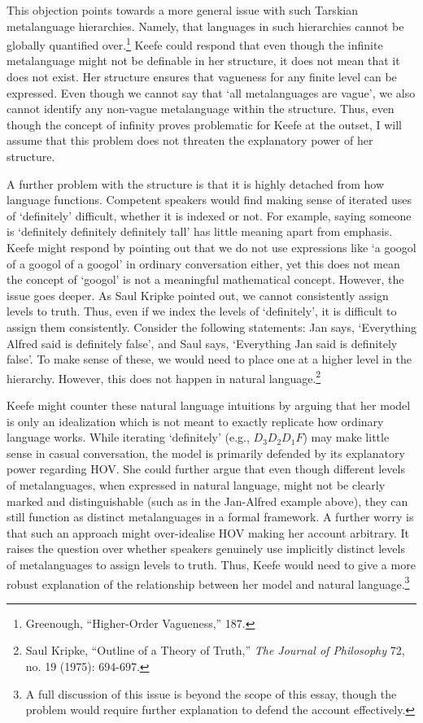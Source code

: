 This objection points towards a more general issue with such Tarskian
metalanguage hierarchies. Namely, that languages in such hierarchies
cannot be globally quantified over.\footnote{Greenough, ``Higher-Order
  Vagueness,'' 187.} Keefe could respond that even though the infinite
metalanguage might not be definable in her structure, it does not mean
that it does not exist. Her structure ensures that vagueness for any
finite level can be expressed. Even though we cannot say that `all
metalanguages are vague', we also cannot identify any non-vague
metalanguage within the structure. Thus, even though the concept of
infinity proves problematic for Keefe at the outset, I will assume that
this problem does not threaten the explanatory power of her structure.

A further problem with the structure is that it is highly detached from
how language functions. Competent speakers would find making sense of
iterated uses of `definitely' difficult, whether it is indexed or not.
For example, saying someone is `definitely definitely definitely tall'
has little meaning apart from emphasis. Keefe might respond by pointing
out that we do not use expressions like `a googol of a googol of a
googol' in ordinary conversation either, yet this does not mean the
concept of `googol' is not a meaningful mathematical concept. However,
the issue goes deeper. As Saul Kripke pointed out, we cannot
consistently assign levels to truth. Thus, even if we index the levels
of `definitely', it is difficult to assign them consistently. Consider
the following statements: Jan says, `Everything Alfred said is
definitely false', and Saul says, `Everything Jan said is definitely
false'. To make sense of these, we would need to place one at a higher
level in the hierarchy. However, this does not happen in natural
language.\footnote{Saul Kripke, ``Outline of a Theory of Truth,''
  \emph{The Journal of Philosophy} 72, no. 19 (1975): 694-697.}

Keefe might counter these natural language intuitions by arguing that
her model is only an idealization which is not meant to exactly
replicate how ordinary language works. While iterating `definitely'
(e.g., \(D_{3}D_{2}D_{1}F\)) may make little sense in casual
conversation, the model is primarily defended by its explanatory power
regarding HOV. She could further argue that even though different levels
of metalanguages, when expressed in natural language, might not be
clearly marked and distinguishable (such as in the Jan-Alfred example
above), they can still function as distinct metalanguages in a formal
framework. A further worry is that such an approach might over-idealise
HOV making her account arbitrary. It raises the question over whether
speakers genuinely use implicitly distinct levels of metalanguages to
assign levels to truth. Thus, Keefe would need to give a more robust
explanation of the relationship between her model and natural
language.\footnote{A full discussion of this issue is beyond the scope
  of this essay, though the problem would require further explanation to
  defend the account effectively.}

